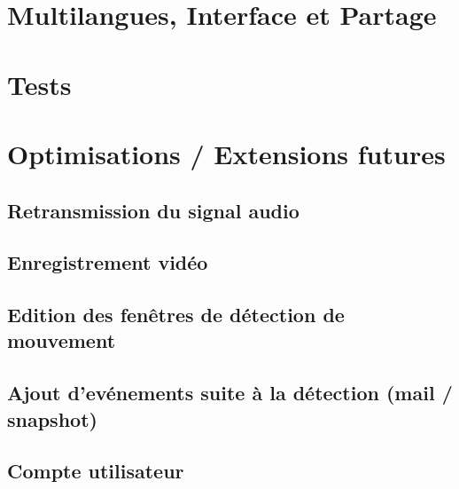 \section{Multilangues, Interface et Partage}

\section{Tests}

\section{Optimisations / Extensions futures}
\subsection{Retransmission du signal audio}
\subsection{Enregistrement vidéo}
\subsection{Edition des fenêtres de détection  de mouvement}
\subsection{Ajout d'evénements suite à la détection (mail / snapshot)}
\subsection{Compte utilisateur}
\clearpage
